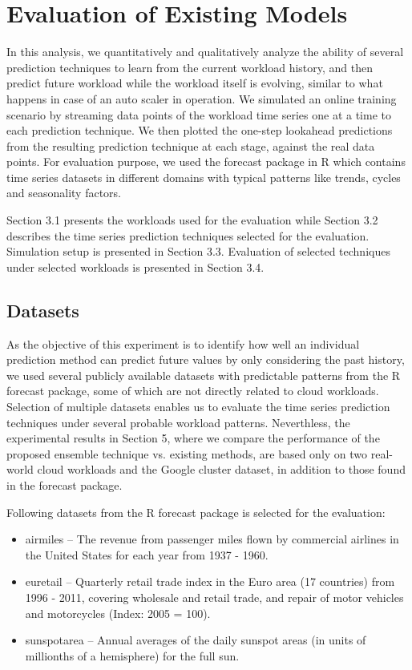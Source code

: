 \section{Evaluation of Existing Models}

In this analysis, we quantitatively and qualitatively analyze the ability of several prediction techniques to learn from the current workload history, and then predict future workload while the workload itself is evolving, similar to what happens in case of an auto scaler in operation. We simulated an online training scenario by streaming data points of the workload time series one at a time to each prediction technique. We then plotted the one-step lookahead predictions from the resulting prediction technique at each stage, against the real data points. For evaluation purpose, we used the forecast package in R \cite{forecastPackage} which contains time series datasets in different domains with typical patterns like trends, cycles and seasonality factors.

Section 3.1 presents the workloads used for the evaluation while Section 3.2 describes the time series prediction techniques selected for the evaluation. Simulation setup is presented in Section 3.3. Evaluation of selected techniques under selected workloads is presented in Section 3.4.

\subsection{Datasets}
As the objective of this experiment is to identify how well an individual prediction method can predict future values by only considering the past history, we used several publicly available datasets with predictable patterns from the R forecast package, some of which are not directly related to cloud workloads. Selection of multiple datasets enables us to evaluate the time series prediction techniques under several probable workload patterns. Neverthless, the experimental results in Section 5, where we compare the performance of the proposed ensemble technique vs. existing methods, are based only on two real-world cloud workloads and the Google cluster dataset, in addition to those found in the forecast package.

Following datasets from the R forecast package is selected for the evaluation:
\begin{itemize}
\item airmiles -- The revenue from passenger miles flown by commercial airlines in the United States for each year from 1937 - 1960.
\item euretail -- Quarterly retail trade index in the Euro area (17 countries) from 1996 - 2011, covering wholesale and retail trade, and repair of motor vehicles and motorcycles (Index: 2005 = 100).
\item sunspotarea -- Annual averages of the daily sunspot areas (in units of millionths of a hemisphere) for the full sun.
\end{itemize}

